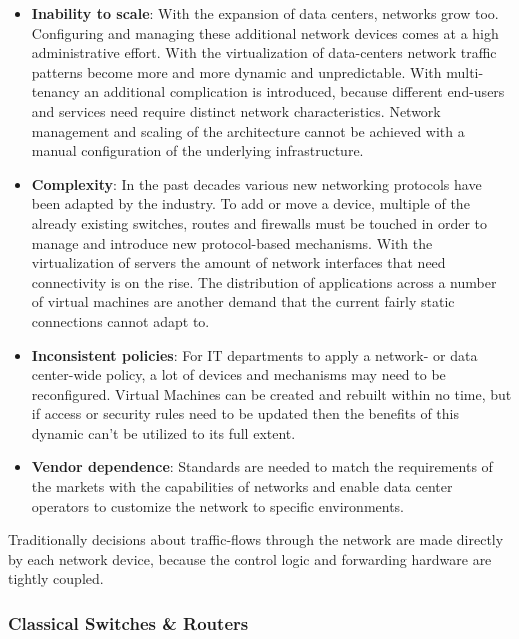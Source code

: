 \begin{itemize}
\item \textbf{Inability to scale}: With the expansion of data centers, networks grow too. Configuring and managing these additional network devices comes at a high administrative effort. With the virtualization of data-centers network traffic patterns become more and more dynamic and unpredictable. With multi-tenancy an additional complication is introduced, because different end-users and services need require distinct network characteristics. Network management and scaling of the architecture cannot be achieved with a manual configuration of the underlying infrastructure.
\item \textbf{Complexity}: In the past decades various new networking protocols have been adapted by the industry. To add or move a device, multiple of the already existing switches, routes and firewalls must be touched in order to manage and introduce new protocol-based mechanisms. With the virtualization of servers the amount of network interfaces that need connectivity is on the rise. The distribution of applications across a number of virtual machines are another demand that the current fairly static connections cannot adapt to.
\item \textbf{Inconsistent policies}: For IT departments to apply a network- or data center-wide policy, a lot of devices and mechanisms may need to be reconfigured. Virtual Machines can be created and rebuilt within no time, but if access or security rules need to be updated then the benefits of this dynamic can't be utilized to its full extent.
\item \textbf{Vendor dependence}: Standards are needed to match the requirements of the markets with the capabilities of networks and enable data center operators to customize the network to specific environments.
\end{itemize}

Traditionally decisions about traffic-flows through the network are made directly by each network device, because the control logic and forwarding hardware are tightly coupled.

\subsubsection{Classical Switches \& Routers}


